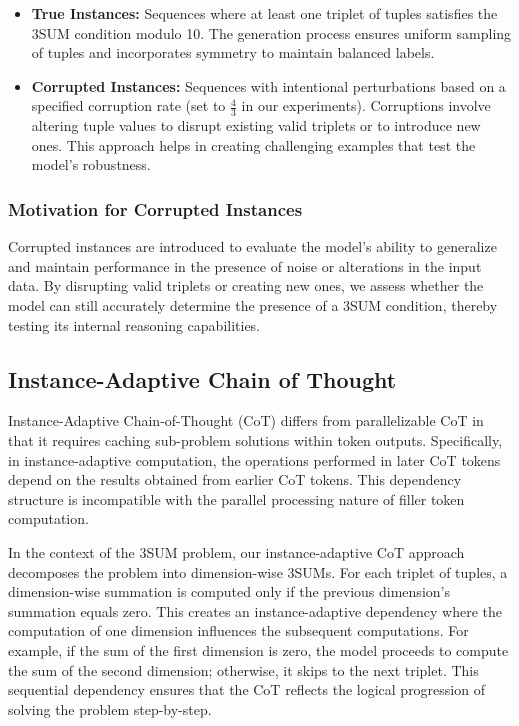 \documentclass{article}
\begin{document}
\begin{itemize}
    \item \textbf{True Instances:} Sequences where at least one triplet of tuples satisfies the 3SUM condition modulo 10. The generation process ensures uniform sampling of tuples and incorporates symmetry to maintain balanced labels.
    
    \item \textbf{Corrupted Instances:} Sequences with intentional perturbations based on a specified corruption rate (set to \( \frac{4}{3} \) in our experiments). Corruptions involve altering tuple values to disrupt existing valid triplets or to introduce new ones. This approach helps in creating challenging examples that test the model's robustness.
\end{itemize}

\subsubsection{Motivation for Corrupted Instances}

Corrupted instances are introduced to evaluate the model's ability to generalize and maintain performance in the presence of noise or alterations in the input data. By disrupting valid triplets or creating new ones, we assess whether the model can still accurately determine the presence of a 3SUM condition, thereby testing its internal reasoning capabilities.

\subsection{Instance-Adaptive Chain of Thought}

Instance-Adaptive Chain-of-Thought (CoT) differs from parallelizable CoT in that it requires caching sub-problem solutions within token outputs. Specifically, in instance-adaptive computation, the operations performed in later CoT tokens depend on the results obtained from earlier CoT tokens. This dependency structure is incompatible with the parallel processing nature of filler token computation.

In the context of the 3SUM problem, our instance-adaptive CoT approach decomposes the problem into dimension-wise 3SUMs. For each triplet of tuples, a dimension-wise summation is computed only if the previous dimension's summation equals zero. This creates an instance-adaptive dependency where the computation of one dimension influences the subsequent computations. For example, if the sum of the first dimension is zero, the model proceeds to compute the sum of the second dimension; otherwise, it skips to the next triplet. This sequential dependency ensures that the CoT reflects the logical progression of solving the problem step-by-step.
\end{document}
